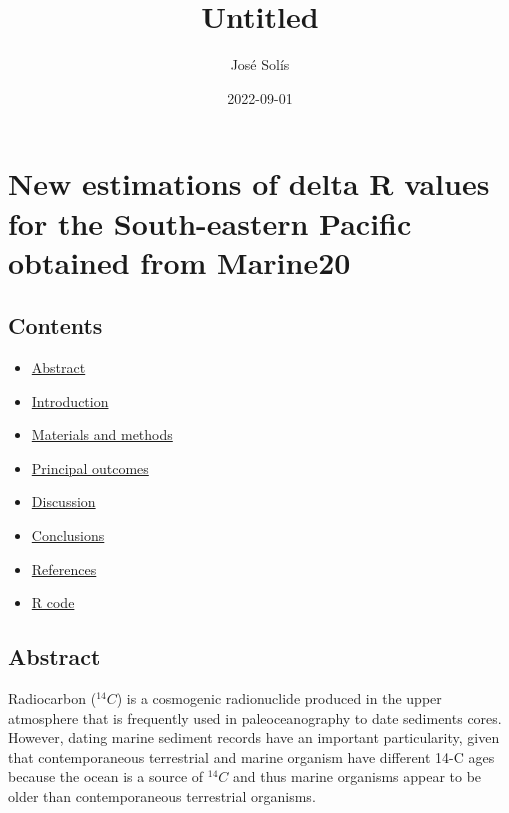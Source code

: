 \documentclass[
]{article}
\title{Untitled}
\author{José Solís}
\date{2022-09-01}
\providecommand{\tightlist}{%
  \setlength{\itemsep}{0pt}\setlength{\parskip}{0pt}}
\begin{document}
\maketitle

\hypertarget{new-estimations-of-delta-r-values-for-the-south-eastern-pacific-obtained-from-marine20}{%
\section{New estimations of delta R values for the South-eastern Pacific
obtained from
Marine20}\label{new-estimations-of-delta-r-values-for-the-south-eastern-pacific-obtained-from-marine20}}

\hypertarget{contents}{%
\subsection{Contents}\label{contents}}

\begin{itemize}
\tightlist
\item
  \protect\hyperlink{abstract}{Abstract}
\item
  \protect\hyperlink{introduction}{Introduction}
\item
  \protect\hyperlink{materials-and-methods}{Materials and methods}
\item
  \protect\hyperlink{principal-outcomes}{Principal outcomes}
\item
  \protect\hyperlink{ux5cux23discussion}{Discussion}
\item
  \protect\hyperlink{conclusions}{Conclusions}
\item
  \protect\hyperlink{references}{References}
\item
  \protect\hyperlink{r-code}{R code}
\end{itemize}

\hypertarget{abstract}{%
\subsection{Abstract}\label{abstract}}

Radiocarbon (\(^{14}C\)) is a cosmogenic radionuclide produced in the
upper atmosphere that is frequently used in paleoceanography to date
sediments cores. However, dating marine sediment records have an
important particularity, given that contemporaneous terrestrial and
marine organism have different 14-C ages because the ocean is a source
of \(^{14}C\) and thus marine organisms appear to be older than
contemporaneous terrestrial organisms.
\end{document}
